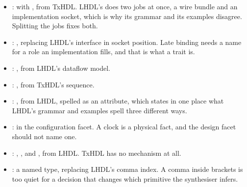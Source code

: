\begin{itemize}
  \item {}:  with , from
        TxHDL. LHDL's  does two jobs at once, a wire bundle
        and an implementation socket, which is why its grammar and its
        examples disagree. Splitting the jobs fixes both.
  \item {}: , replacing LHDL's
        interface in socket position. Late binding needs a name for a role
        an implementation fills, and that is what a trait is.
  \item {}: , from LHDL's dataflow model.
  \item {}: , from TxHDL's sequence.
  \item {}: , from LHDL, spelled as an
        attribute, which states in one place what LHDL's grammar and
        examples spell three different ways.
  \item {}:  in the configuration facet. A
        clock is a physical fact, and the design facet should not name one.
  \item {}: , ,
         and , from LHDL. TxHDL has no
        mechanism at all.
  \item {}: a named type, replacing LHDL's comma
        index. A comma inside brackets is too quiet for a decision that
        changes which primitive the synthesiser infers.
\end{itemize}

